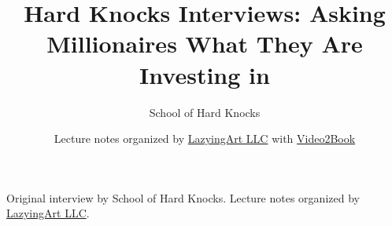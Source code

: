 \documentclass[11pt,oneside]{book}
\begin{document}
\frontmatter
\title{Hard Knocks Interviews: Asking Millionaires What They Are Investing in}
\author{School of Hard Knocks}
\date{Lecture notes organized by \href{https://lazying.art}{LazyingArt LLC} with \href{https://github.com/lachlanchen/Video2Book}{Video2Book}}
\maketitle
\begin{center}
\small Original interview by School of Hard Knocks. Lecture notes organized by \href{https://lazying.art}{LazyingArt LLC}.
\end{center}
\clearpage
\mainmatter

\end{document}
